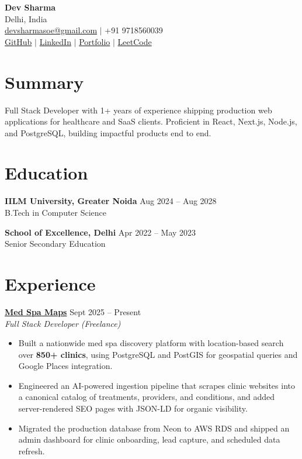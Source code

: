 \documentclass[11pt]{article}
\begin{document}
\begin{center}
    {\LARGE \textbf{Dev Sharma}} \\[-1pt]
    Delhi, India \\
    \href{mailto:devsharmasoe@gmail.com}{devsharmasoe@gmail.com} $|$ +91 9718560039 \\
    \href{https://github.com/devsharmagit}{GitHub} $|$
    \href{https://www.linkedin.com/in/devsharmalkd/}{LinkedIn} $|$
    \href{https://www.devsharma.me/}{Portfolio} $|$
    \href{https://leetcode.com/u/devsharmasoe/}{LeetCode}
\end{center}

\section*{Summary}

Full Stack Developer with 1+ years of experience shipping production web applications for healthcare and SaaS clients. Proficient in React, Next.js, Node.js, and PostgreSQL, building impactful products end to end.

\section*{Education}

\textbf{IILM University, Greater Noida} \hfill Aug 2024 -- Aug 2028 \\
B.Tech in Computer Science

\vspace{2pt}

\textbf{School of Excellence, Delhi} \hfill Apr 2022 -- May 2023 \\
Senior Secondary Education

\section*{Experience}

\textbf{\href{https://medspamaps.com}{Med Spa Maps}} \hfill Sept 2025 -- Present \\
\textit{Full Stack Developer (Freelance)}

\begin{itemize}
    \item Built a nationwide med spa discovery platform with location-based search over \textbf{850+ clinics}, using PostgreSQL and PostGIS for geospatial queries and Google Places integration.

    \item Engineered an AI-powered ingestion pipeline that scrapes clinic websites into a canonical catalog of treatments, providers, and conditions, and added server-rendered SEO pages with JSON-LD for organic visibility.

    \item Migrated the production database from Neon to AWS RDS and shipped an admin dashboard for clinic onboarding, lead capture, and scheduled data refresh.
\end{itemize}
\end{document}
